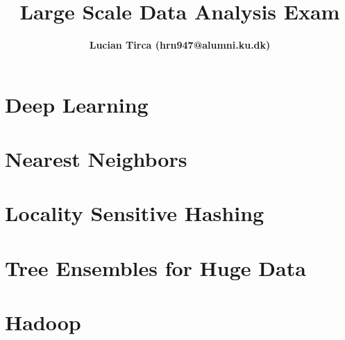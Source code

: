 \documentclass{article}
\begin{document}
\title{\textbf{Large Scale Data Analysis Exam}}
\author{\textbf{Lucian Tirca (hrn947@alumni.ku.dk)}}
\maketitle


\section{Deep Learning}



\section{Nearest Neighbors}



\section{Locality Sensitive Hashing}



\section{Tree Ensembles for Huge Data}


\section{Hadoop}




\printbibliography
\end{document}
